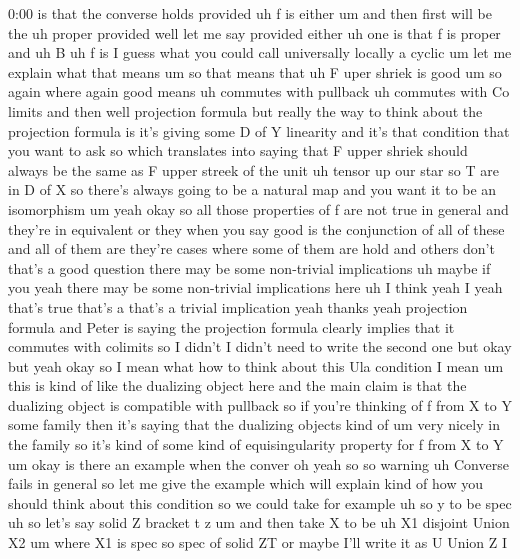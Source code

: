 \begin{unfinished}{0:00}
is  that  the  converse
holds
provided  uh  f  is
either  um  and  then  first  will  be  the  uh
proper  provided  well  let  me  say  provided
either  uh  one  is  that  f  is
proper
and  uh
B  uh  f  is  I  guess  what  you  could  call
universally  locally  a
cyclic  um  let  me  explain  what  that  means
um  so  that  means  that
uh  F  uper  shriek  is
good
um  so  again  where  again  good  means
uh  commutes  with
pullback  uh  commutes  with  Co
limits  and  then  well  projection
formula  but  really  the  way  to  think
about  the  projection  formula  is  it's
giving  some  D  of  Y  linearity  and  it's
that  condition  that  you  want  to  ask  so
which  translates  into  saying  that  F
upper  shriek  should  always  be  the  same
as  F  upper  streek  of  the  unit  uh  tensor
up  our
star
so  T  are  in  D  of  X  so  there's  always
going  to  be  a  natural  map  and  you  want
it  to  be  an
isomorphism
um
yeah
okay
so  all  those  properties  of
f  are  not  true  in
general  and  they're  in  equivalent  or
they  when  you  say  good  is  the
conjunction  of  all  of  these  and  all  of
them
are  they're  cases  where  some  of  them  are
hold  and  others  don't  that's  a  good
question  there  may  be  some  non-trivial
implications  uh  maybe  if
you  yeah  there  may  be  some  non-trivial
implications  here  uh  I  think  yeah
I  yeah  that's  true  that's  a  that's  a
trivial  implication  yeah  thanks  yeah
projection  formula
and  Peter  is  saying  the  projection
formula  clearly  implies  that  it  commutes
with  colimits  so  I  didn't  I  didn't  need
to  write  the  second  one  but  okay  but
yeah
okay  so  I  mean  what  how  to  think  about
this  Ula  condition  I  mean
um  this  is  kind  of  like  the  dualizing
object  here  and  the  main  claim  is  that
the  dualizing  object  is  compatible  with
pullback  so  if  you're  thinking  of  f  from
X  to  Y  some  family  then  it's  saying  that
the  dualizing  objects  kind
of
um  very  nicely  in  the  family
so  it's  kind  of  some  kind  of
equisingularity  property  for  f  from  X  to
Y  um  okay  is  there  an  example  when  the
conver
oh  yeah  so  so
warning
uh  Converse  fails  in
general  so  let  me  give  the  example  which
will  explain  kind  of  how  you  should
think  about  this
condition  so  we  could  take  for  example
uh  so  y  to  be
spec  uh  so  let's  say
solid  Z  bracket  t
z
um  and  then  take  X  to  be  uh  X1  disjoint
Union
X2  um  where  X1  is
spec
so  spec  of  solid
ZT  or  maybe  I'll  write  it  as  U  Union  Z  I

\end{unfinished}

